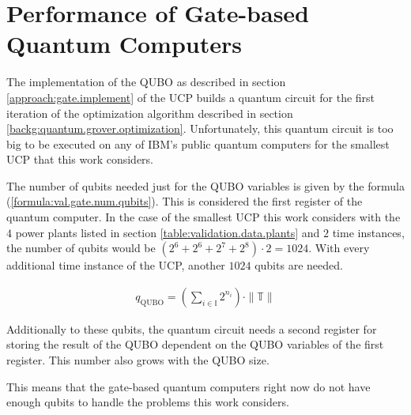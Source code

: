 \section{Performance of Gate-based Quantum Computers}

The implementation of the QUBO as described in section \ref{approach:gate.implement} of the UCP builds a quantum circuit for the first iteration of the optimization algorithm described in section \ref{backg:quantum.grover.optimization}.
Unfortunately, this quantum circuit is too big to be executed on any of IBM's public quantum computers for the smallest UCP that this work considers.

The number of qubits needed just for the QUBO variables is given by the formula (\ref{formula:val.gate.num.qubits}).
This is considered the first register of the quantum computer.
In the case of the smallest UCP this work considers with the $4$ power plants listed in section \ref{table:validation.data.plants} and $2$ time instances, the number of qubits would be $\left( 2^6 + 2^6 + 2^7 + 2^8 \right) \cdot 2 = 1024$.
With every additional time instance of the UCP, another $1024$ qubits are needed.

\begin{align}
  \label{formula:val.gate.num.qubits}
  q_{\text{QUBO}} = \left( \sum_{i \in \mathbb{I}} 2^{n_i} \right) \cdot \| \mathbb{T} \|
\end{align}

Additionally to these qubits, the quantum circuit needs a second register for storing the result of the QUBO dependent on the QUBO variables of the first register.
This number also grows with the QUBO size.

This means that the gate-based quantum computers right now do not have enough qubits to handle the problems this work considers.
